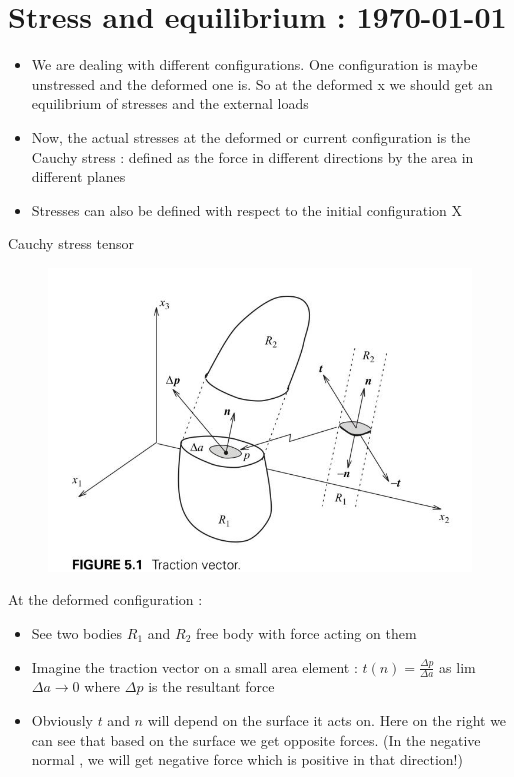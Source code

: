 




	\tableofcontents

\section{Stress and equilibrium : \today}

	\begin{frame}
		\begin{itemize}
		\item We are dealing with different configurations. One configuration is maybe unstressed and the deformed one is. So at the deformed x we should get an equilibrium of stresses and the external loads
		\item Now, the actual stresses at the deformed or current configuration is the Cauchy stress : defined as the force in different directions by the area in different planes
		\item Stresses can also be defined with respect to the initial configuration X			
					
		\end{itemize}

	\end{frame}

	\begin{frame}{Cauchy stress tensor}
		\begin{figure}
			\centering
			\includegraphics[width=0.5\linewidth]{Figure/fig7}
		\end{figure}
		At the deformed configuration :
		\begin{itemize}
			\item See two bodies $R_1$ and $R_2$ free body with force acting on them
			\item Imagine the traction vector on a small area element : ${t(n) = \frac{\Delta p}{\Delta a}}$ as lim $\Delta a \rightarrow 0$ where $\Delta p$ is the resultant force
			\item Obviously $t$ and $n$ will depend on the surface it acts on. Here on the right we can see that based on the surface we get opposite forces. (In the negative normal , we will get negative force which is positive in that direction!)

		\end{itemize}
	\end{frame}

